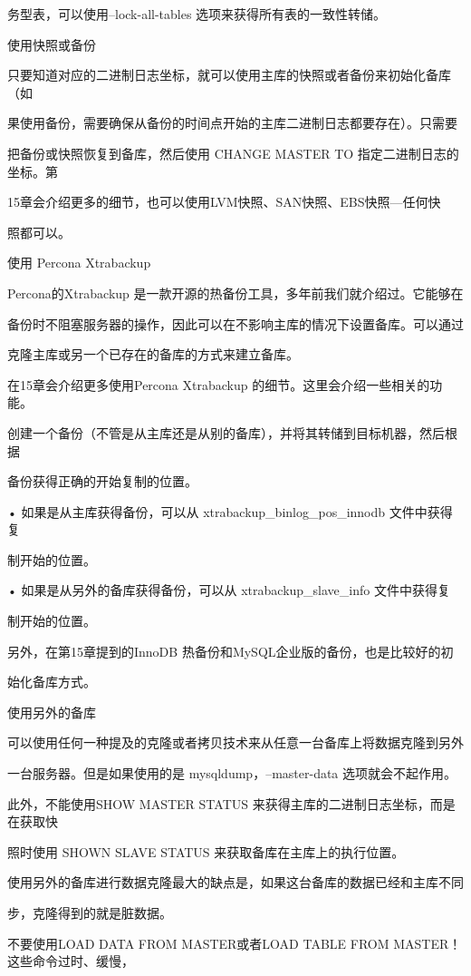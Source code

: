 务型表，可以使用--lock-all-tables 选项来获得所有表的一致性转储。

使用快照或备份

只要知道对应的二进制日志坐标，就可以使用主库的快照或者备份来初始化备库（如

果使用备份，需要确保从备份的时间点开始的主库二进制日志都要存在）。只需要

把备份或快照恢复到备库，然后使用 CHANGE MASTER TO 指定二进制日志的坐标。第

15章会介绍更多的细节，也可以使用LVM快照、SAN快照、EBS快照—任何快

照都可以。

使用 Percona Xtrabackup

Percona的Xtrabackup 是一款开源的热备份工具，多年前我们就介绍过。它能够在

备份时不阻塞服务器的操作，因此可以在不影响主库的情况下设置备库。可以通过

克隆主库或另一个已存在的备库的方式来建立备库。

在15章会介绍更多使用Percona Xtrabackup 的细节。这里会介绍一些相关的功能。

创建一个备份（不管是从主库还是从别的备库），并将其转储到目标机器，然后根据

备份获得正确的开始复制的位置。

• 如果是从主库获得备份，可以从 xtrabackup\_binlog\_pos\_innodb 文件中获得复

制开始的位置。

• 如果是从另外的备库获得备份，可以从 xtrabackup\_slave\_info 文件中获得复

制开始的位置。

另外，在第15章提到的InnoDB 热备份和MySQL企业版的备份，也是比较好的初

始化备库方式。

使用另外的备库

可以使用任何一种提及的克隆或者拷贝技术来从任意一台备库上将数据克隆到另外

一台服务器。但是如果使用的是 mysqldump，--master-data 选项就会不起作用。

此外，不能使用SHOW MASTER STATUS 来获得主库的二进制日志坐标，而是在获取快

照时使用 SHOWN SLAVE STATUS 来获取备库在主库上的执行位置。

使用另外的备库进行数据克隆最大的缺点是，如果这台备库的数据已经和主库不同

步，克隆得到的就是脏数据。

不要使用LOAD DATA FROM MASTER或者LOAD TABLE FROM MASTER！这些命令过时、缓慢，

